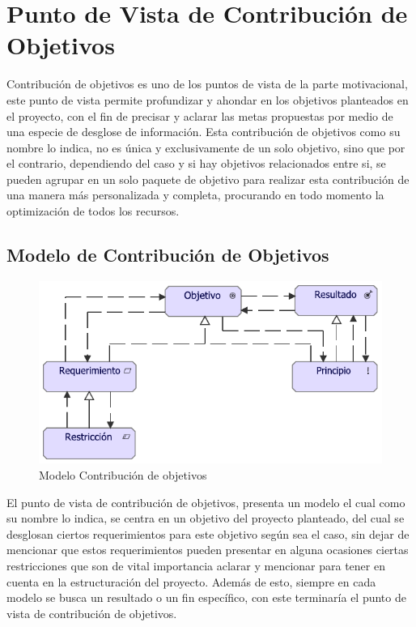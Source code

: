 \section{Punto de Vista de Contribución de Objetivos}
Contribución de objetivos es uno de los puntos de vista de la parte motivacional, este punto de vista permite profundizar y ahondar en los objetivos planteados en el proyecto, con el fin de precisar y aclarar las metas propuestas por medio de una especie de desglose de información. Esta contribución de objetivos como su nombre lo indica, no es única y exclusivamente de un solo objetivo, sino que por el contrario, dependiendo del caso y si hay objetivos relacionados entre si, se pueden agrupar en un solo paquete de objetivo para realizar esta contribución de una manera más personalizada y completa, procurando en todo momento la optimización de todos los recursos.

\subsection{Modelo de Contribución de Objetivos}
\begin{figure}[h!]
	\centering
	\includegraphics[width=1.0\linewidth]{imgs/modelo/ContObjetivos}
	\caption{Modelo Contribución de objetivos}
\end{figure}

El punto de vista de contribución de objetivos, presenta un modelo el cual como su nombre lo indica, se centra en un objetivo del proyecto planteado, del cual se desglosan ciertos requerimientos para este objetivo según sea el caso, sin dejar de mencionar que estos requerimientos pueden presentar en alguna ocasiones ciertas restricciones que son de vital importancia aclarar y mencionar para tener en cuenta en la estructuración del proyecto. Además de esto, siempre en cada modelo se busca un resultado o un fin específico, con este terminaría el punto de vista de contribución de objetivos.

